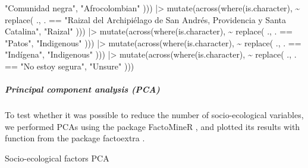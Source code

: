 \documentclass[
  bookmarksnumbered]{article}
\newenvironment{Shaded}{\begin{snugshade}}{\end{snugshade}}
\newcommand{\FunctionTok}[1]{\textcolor[rgb]{0.94,0.94,0.56}{#1}}
\newcommand{\NormalTok}[1]{\textcolor[rgb]{0.80,0.80,0.80}{#1}}
\newcommand{\SpecialCharTok}[1]{\textcolor[rgb]{0.86,0.64,0.64}{#1}}
\newcommand{\StringTok}[1]{\textcolor[rgb]{0.80,0.58,0.58}{#1}}
\begin{document}
\begin{Shaded}
\begin{Highlighting}[]
      \StringTok{"Comunidad negra"}\NormalTok{,}
    \StringTok{"Afrocolombian"}
\NormalTok{  ))) }\SpecialCharTok{|\textgreater{}}
  \FunctionTok{mutate}\NormalTok{(}\FunctionTok{across}\NormalTok{(}\FunctionTok{where}\NormalTok{(is.character), }\SpecialCharTok{\textasciitilde{}} \FunctionTok{replace}\NormalTok{(}
\NormalTok{    ., . }\SpecialCharTok{==}
      \StringTok{"Raizal del Archipiélago de San Andrés, Providencia y Santa Catalina"}\NormalTok{,}
    \StringTok{"Raizal"}
\NormalTok{  ))) }\SpecialCharTok{|\textgreater{}}
  \FunctionTok{mutate}\NormalTok{(}\FunctionTok{across}\NormalTok{(}\FunctionTok{where}\NormalTok{(is.character), }\SpecialCharTok{\textasciitilde{}} \FunctionTok{replace}\NormalTok{(}
\NormalTok{    ., . }\SpecialCharTok{==}
      \StringTok{"Patos"}\NormalTok{,}
    \StringTok{"Indigenous"}
\NormalTok{  ))) }\SpecialCharTok{|\textgreater{}}
  \FunctionTok{mutate}\NormalTok{(}\FunctionTok{across}\NormalTok{(}\FunctionTok{where}\NormalTok{(is.character), }\SpecialCharTok{\textasciitilde{}} \FunctionTok{replace}\NormalTok{(}
\NormalTok{    ., . }\SpecialCharTok{==}
      \StringTok{"Indígena"}\NormalTok{,}
    \StringTok{"Indigenous"}
\NormalTok{  ))) }\SpecialCharTok{|\textgreater{}}
  \FunctionTok{mutate}\NormalTok{(}\FunctionTok{across}\NormalTok{(}\FunctionTok{where}\NormalTok{(is.character), }\SpecialCharTok{\textasciitilde{}} \FunctionTok{replace}\NormalTok{(}
\NormalTok{    ., . }\SpecialCharTok{==}
      \StringTok{"No estoy segura"}\NormalTok{,}
    \StringTok{"Unsure"}
\NormalTok{  )))}
\end{Highlighting}
\end{Shaded}

\subparagraph{Principal component analysis (PCA)}\label{principal-component-analysis-pca}

To test whether it was possible to reduce the number of socio-ecological variables, we performed PCAs using the package FactoMineR \autocite{factominercit}, and plotted its results with function from the package factoextra \autocite{factoextracit}.

Socio-ecological factors PCA
\end{document}

